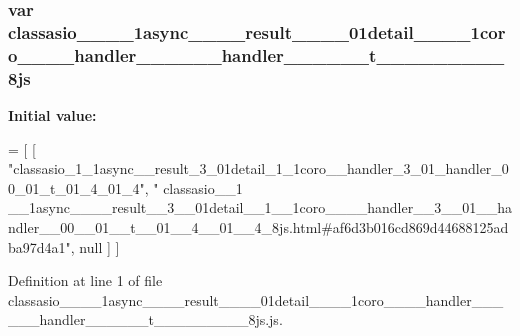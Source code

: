 \subsubsection[{classasio\+\_\+\+\_\+1\+\_\+\+\_\+1async\+\_\+\+\_\+\+\_\+\+\_\+result\+\_\+\+\_\+3\+\_\+\+\_\+01detail\+\_\+\+\_\+1\+\_\+\+\_\+1coro\+\_\+\+\_\+\+\_\+\+\_\+handler\+\_\+\+\_\+3\+\_\+\+\_\+01\+\_\+\+\_\+handler\+\_\+\+\_\+00\+\_\+\+\_\+01\+\_\+\+\_\+t\+\_\+\+\_\+01\+\_\+\+\_\+4\+\_\+\+\_\+01\+\_\+\+\_\+4\+\_\+8js}]{\setlength{\rightskip}{0pt plus 5cm}var classasio\+\_\+\+\_\+\_\+\+\_\+1async\+\_\+\+\_\+\+\_\+\+\_\+result\+\_\+\+\_\+\_\+\+\_\+01detail\+\_\+\+\_\+\_\+\+\_\+1coro\+\_\+\+\_\+\+\_\+\+\_\+handler\+\_\+\+\_\+\_\+\+\_\+\_\+\+\_\+handler\+\_\+\+\_\+\_\+\+\_\+\_\+\+\_\+t\+\_\+\+\_\+\_\+\+\_\+\_\+\+\_\+\_\+\+\_\+\_\+8js}\label{classasio____1____1async________result____3____01detail____1____1coro________handler____3____01_309cef2586e2461338edd1ab5ff8e70a_a6c83fc98e507df5f1e88054d4856a979}
{\bfseries Initial value\+:}
\begin{DoxyCode}
=
[
    [ \textcolor{stringliteral}{"classasio\_1\_1async\_\_result\_3\_01detail\_1\_1coro\_\_handler\_3\_01\_handler\_00\_01\_t\_01\_4\_01\_4"}, \textcolor{stringliteral}{"
      classasio\_\_1
      \_\_1async\_\_\_\_result\_\_3\_\_01detail\_\_1\_\_1coro\_\_\_\_handler\_\_3\_\_01\_\_handler\_\_00\_\_01\_\_t\_\_01\_\_4\_\_01\_\_4\_8js.html#af6d3b016cd869d44688125adba97d4a1"}, null ]
]
\end{DoxyCode}


Definition at line 1 of file classasio\+\_\+\+\_\+\_\+\+\_\+1async\+\_\+\+\_\+\+\_\+\+\_\+result\+\_\+\+\_\+\_\+\+\_\+01detail\+\_\+\+\_\+\_\+\+\_\+1coro\+\_\+\+\_\+\+\_\+\+\_\+handler\+\_\+\+\_\+\_\+\+\_\+\_\+\+\_\+handler\+\_\+\+\_\+\_\+\+\_\+\_\+\+\_\+t\+\_\+\+\_\+\_\+\+\_\+\_\+\+\_\+\_\+\+\_\+\_\+8js.\+js.

